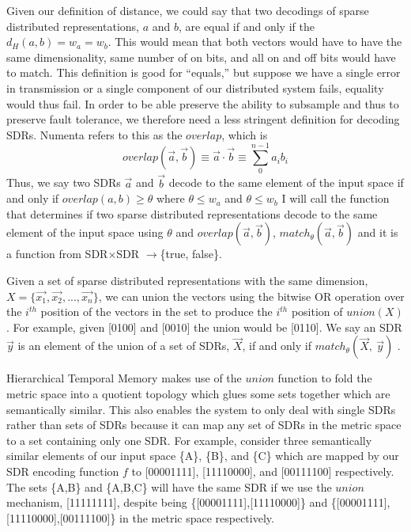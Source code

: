 \documentclass[fleqn,notitlepage,minimal]{article}
\begin{document}
	Given our definition of distance, we could say that two decodings of sparse distributed representations, $a$ and $b$, are equal if and only if the $d_{H}(a,b) = w_{a} = w_{b}$. This would mean that both vectors would have to have the same dimensionality, same number of on bits, and all on and off bits would have to match. This definition is good for ``equals,'' but suppose we have a single error in transmission or a single component of our distributed system fails, equality would thus fail. In order to be able preserve the ability to subsample and thus to preserve fault tolerance, we therefore need a less stringent definition for decoding SDRs. Numenta refers to this as the $overlap$, which is $$ overlap(\overrightarrow{a}, \overrightarrow{b}) \equiv \overrightarrow{a} \cdot \overrightarrow{b} \equiv \sum_{0}^{n-1} a_{i}b_{i}$$ Thus, we say two SDRs $\overrightarrow{a}$ and $\overrightarrow{b}$ decode to the same element of the input space if and only if $overlap(a,b) \geq \theta$ where $\theta \leq w_{a}$ and $\theta \leq w_{b}$ \cite{Properties} I will call the function that determines if two sparse distributed representations decode to the same element of the input space using $\theta$ and $overlap(\overrightarrow{a}, \overrightarrow{b})$, $match_{\theta}(\overrightarrow{a}, \overrightarrow{b})$ and it is a function from SDR$\times$SDR $\longrightarrow$\{true, false\}.
	
	Given a set of sparse distributed representations with the same dimension, $X =\{\overrightarrow{x_{1}}, \overrightarrow{x_{2}}, ...,\overrightarrow{x_{n}}\}$, we can union the vectors using the bitwise OR operation over the $i^{th}$ position of the vectors in the set to produce the $i^{th}$ position of $union(X)$ \cite{Properties}. For example, given [0100] and [0010] the union would be [0110]. We say an SDR $\overrightarrow{y}$ is an element of the union of a set of SDRs, $\overrightarrow{X}$, if and only if $match_{\theta}(\overrightarrow{X},\ \overrightarrow{y})$ \cite{Properties}.
	
	Hierarchical Temporal Memory makes use of the $union$ function to fold the metric space into a quotient topology which glues some sets together which are semantically similar. This also enables the system to only deal with single SDRs rather than sets of SDRs because it can map any set of SDRs in the metric space to a set containing only one SDR. For example, consider three semantically similar elements of our input space \{A\}, \{B\}, and \{C\} which are mapped by our SDR encoding function $f$ to [00001111], [11110000], and [00111100] respectively. The sets \{A,B\} and \{A,B,C\} will have the same SDR if we use the $union$ mechanism, [11111111], despite being \{[00001111],[11110000]\} and \{[00001111],[11110000],[00111100]\} in the metric space respectively.
	
\end{document}
